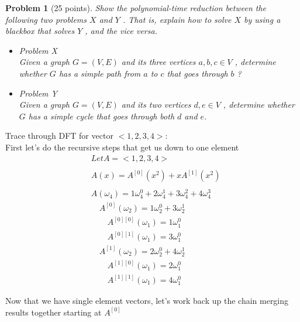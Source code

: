 \documentclass[11pt]{article}
\newtheorem{problem}{Problem}
\begin{document}
\begin{problem}[25 points]
\label{prob:4}
Show the polynomial-time reduction between the following two problems $X$ and $Y$ . That is,
explain how to solve $X$ by using a blackbox that solves $Y$ , and the vice versa.
\begin{itemize}
\item Problem X \\
Given a graph $G = (V,E)$ and its three vertices $a, b, c \in V$ , determine whether $G$ has a simple path from $a$ to $c$ that goes through $b$ ?
\item Problem Y \\
Given a graph $G = (V,E)$ and its two vertices $d, e \in V$ , determine whether $G$ has a simple cycle that goes through both $d$ and $e$.
\end{itemize}
\end{problem}


\newpage


\bigskip
{}

Trace through DFT for vector $<1,2,3,4>$:
\\
First let's do the recursive steps that get us down to one element
\begin{equation}
\begin{split}
& Let A = <1,2,3,4>\\
\\
& A(x) = A^{[0]}(x^2) + x A^{[1]}(x^2)\\
\\
& A(\omega_4) = 1\omega_4^0 + 2\omega_4^1 + 3\omega_4^2 + 4\omega_4^3\\
& \quad A^{[0]}(\omega_2) = 1\omega_2^0 + 3\omega_2^1\\
& \quad \quad A^{[0][0]}(\omega_1) = 1\omega_1^0\\
& \quad \quad A^{[0][1]}(\omega_1) = 3\omega_1^0\\
& \quad A^{[1]}(\omega_2) = 2\omega_2^0 + 4\omega_2^1\\
& \quad \quad A^{[1][0]}(\omega_1) = 2\omega_1^0\\
& \quad \quad A^{[1][1]}(\omega_1) = 4\omega_1^0
\end{split}
\end{equation}

Now that we have single element vectors, let's work back up the chain
merging results together starting at $A^{[0]}$
\end{document}
